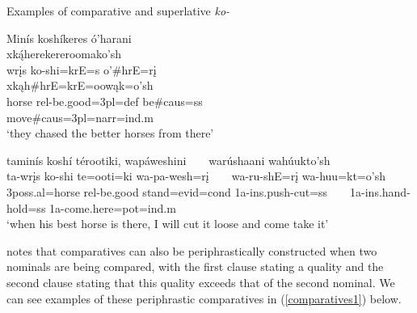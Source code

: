 \begin{exe}

\item\label{compko} Examples of comparative and superlative \textit{ko-}

	\begin{xlist}
	
	\item\label{compko1} \glll Minís koshíkeres ó'harani ~ ~ ~ ~ ~ ~ ~ ~ ~ ~ ~ ~ ~ ~ ~ ~ ~ ~ ~ ~ xką́herekereroomako'sh\\
	wrįs ko-shi=krE=s o'\#hrE=rį ~ ~ ~ ~ ~ ~ ~ ~ ~ ~ ~ ~ ~ ~ ~ ~ ~ ~ ~ ~ xkąh\#hrE=krE=oowąk=o'sh\\
	\textnormal{horse} rel-\textnormal{be.good}=3pl=def \textnormal{be}\#caus=ss ~ ~ ~ ~ ~ ~ ~ ~ ~ ~ ~ ~ ~ ~ ~ ~ ~ ~ ~ ~ \textnormal{move}\#caus=3pl=narr=ind.m\\
	\glt `they chased the better horses from there' \citep[84]{hollow1973b}
	
	\item\label{compko2} \glll taminís koshí térootiki, wapáweshini ~ ~ warúshaani wahúukto'sh\\
	ta-wrįs ko-shi te=ooti=ki wa-pa-wesh=rį ~ ~ wa-ru-shE=rį wa-huu=kt=o'sh\\
	3poss.al=\textnormal{horse} rel-\textnormal{be.good} \textnormal{stand}=evid=cond 1a-ins.push-\textnormal{cut}=ss ~ ~ 1a-ins.hand-\textnormal{hold}=ss 1a-\textnormal{come.here}=pot=ind.m\\
	\glt `when his best horse is there, I will cut it loose and come take it' \citep[259]{hollow1973b}
	
	\end{xlist}	

\end{exe}

\citet[22]{mixco1997a} notes that comparatives can also be periphrastically constructed when two nominals are being compared, with the first clause stating a quality and the second clause stating that this quality exceeds that of the second nominal. We can see examples of these periphrastic comparatives in (\ref{comparatives1}) below.


